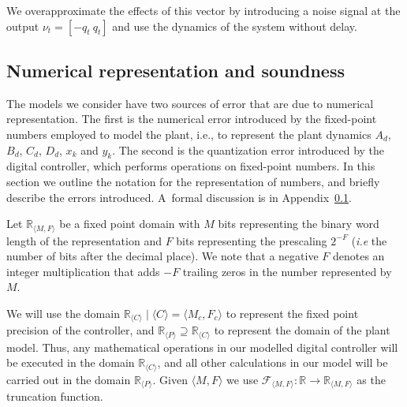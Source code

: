 \documentclass[sigconf]{llncs}
\begin{document}
We overapproximate the effects of this vector by introducing a noise signal at the output $\nu_t=[-q_t\ q_t]$ and use the dynamics of the system without delay.

\subsection{Numerical representation and soundness} 
\label{sec:numeric_rep}

The models we consider have two sources of error that are due to numerical  
representation.  The first is the numerical error introduced by the
fixed-point numbers employed to model the plant, i.e., to represent the
plant dynamics $A_d$, $B_d$, $C_d$, $D_d$, $x_k$ and $y_k$.
The second is the quantization error
introduced by the digital controller, which performs operations on
fixed-point numbers.  In this section we outline the notation for the
representation of numbers, and briefly describe the errors
introduced.  A~formal discussion is in
Appendix~\ref{sec:numeric_rep}.

Let $\mathbb{R}_{\langle M,F \rangle}$ be a fixed point domain with $M$ bits
representing the binary word length of the representation and $F$ bits
representing the prescaling $2^{-F}$ (\emph{i.e} the number of bits after
the decimal place).  We note that a negative $F$ denotes an integer
multiplication that adds $-F$ trailing zeros in the number represented by
$M$.

We will use the domain $\mathbb{R}_{\langle C \rangle} \mid \langle C \rangle = \langle M_c,F_c \rangle$
to represent the fixed point precision of the controller, and 
$\mathbb{R}_{\langle P \rangle} \supseteq \mathbb{R}_{\langle C \rangle}$
to represent the domain of the plant model.
Thus, any mathematical operations in our modelled digital controller will be executed in the
domain $\mathbb{R}_{\langle C \rangle}$, and all other calculations
in our model will be carried out in the domain $\mathbb{R}_{\langle P \rangle}$.
Given ${\langle M,F \rangle}$ we use $\mathcal{F}_{\langle M,F \rangle} : \mathbb{R} \rightarrow \mathbb{R}_{\langle M,F \rangle}$ as the truncation function.
\end{document}
